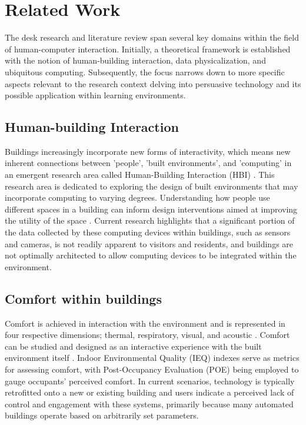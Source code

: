 \section{Related Work}

The desk research and literature review span several key domains within the field of human-computer interaction. Initially, a theoretical framework is established with the notion of human-building interaction, data physicalization, and ubiquitous computing. Subsequently, the focus narrows down to more specific aspects relevant to the research context delving into persuasive technology and its possible application within learning environments.

\subsection{Human-building Interaction}
Buildings increasingly incorporate new forms of interactivity, which means new inherent connections between 'people', 'built environments', and 'computing' in an emergent research area called Human-Building Interaction (HBI) \cite{hbi}. This research area is dedicated to exploring the design of built environments that may incorporate computing to varying degrees. Understanding how people use different spaces in a building can inform design interventions aimed at improving the utility of the space \cite{informed}. Current research highlights that a significant portion of the data collected by these computing devices within buildings, such as sensors and cameras, is not readily apparent to visitors and residents, and buildings are not optimally architected to allow computing devices to be integrated within the environment.

\subsection{Comfort within buildings}

Comfort is achieved in interaction with the environment and is represented in four respective dimensions; thermal, respiratory, visual, and acoustic \cite{comfort}. Comfort can be studied and designed as an interactive experience with the built environment itself \cite{environment}. Indoor Environmental Quality (IEQ) indexes serve as metrics for assessing comfort, with Post-Occupancy Evaluation (POE) being employed to gauge occupants' perceived comfort. In current scenarios, technology is typically retrofitted onto a new or existing building and users indicate a perceived lack of control and engagement with these systems, primarily because many automated buildings operate based on arbitrarily set parameters.

